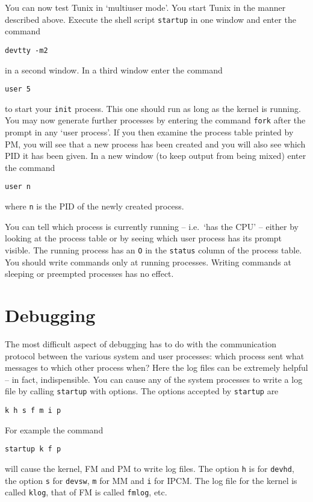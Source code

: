 You can now test Tunix in `multiuser mode'. You start Tunix
in the manner described above. Execute the shell script
{\tt startup} in one window and enter the command
\begin{verbatim}
devtty -m2
\end{verbatim}
in a second window. In a third window enter the
command
\begin{verbatim}
user 5
\end{verbatim}
to start your {\tt init} process. This one should run
as long as the kernel is running. You may now generate
further processes by entering the command {\tt fork}
after the prompt in any `user process'. If you then
examine the process table printed by PM, you will
see that a new process has been created and you will
also see which PID it has been given. In a new window
(to keep output from being mixed) enter the
command
\begin{verbatim}
user n
\end{verbatim}
where {\tt n} is the PID of the newly created process.


You can tell which process is currently running --
i.e.\ `has the CPU' -- either by looking at the process
table or by seeing which user process has its prompt
visible. The running process has an {\tt O} in the
{\tt status} column of the process table. You should write commands
only at running processes. Writing commands at sleeping
or preempted processes has no effect.


\section{Debugging}
\noindent

The most difficult aspect of debugging has to do
with the communication protocol between the various
system and user processes: which process sent what
messages to which other process when? Here the
log files can be extremely helpful -- in fact,
indispensible. You can cause any of the system
processes to write a log file by calling
{\tt startup} with options. The options accepted
by {\tt startup} are
\begin{verbatim}
k h s f m i p
\end{verbatim}
For example the command
\begin{verbatim}
startup k f p
\end{verbatim}
will cause the kernel, FM and PM to write log files.
The option {\tt h} is for {\tt devhd}, the option
{\tt s} for {\tt devsw}, {\tt m} for MM and {\tt i}
for IPCM. The log file for the kernel is called
{\tt klog}, that of FM is called {\tt fmlog}, etc.


